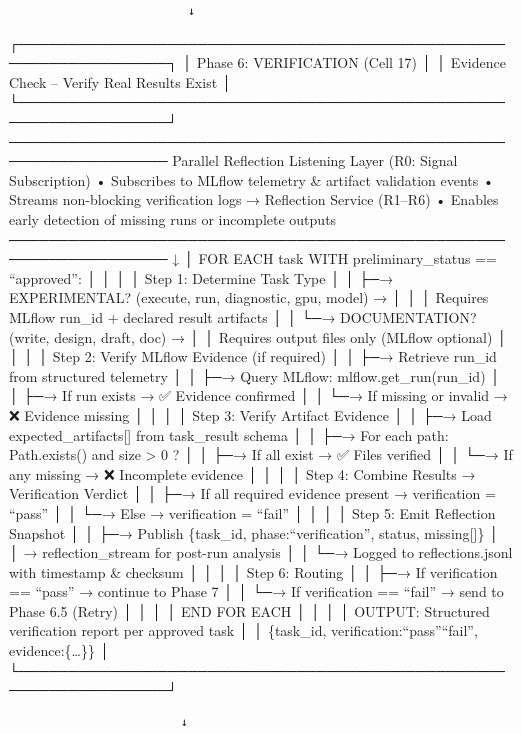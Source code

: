 \documentclass[
]{article}
\begin{document}
\begin{verbatim}
                         ↓
\end{verbatim}

┌─────────────────────────────────────────────────────────────────┐ │
Phase 6: VERIFICATION (Cell 17) │ │ Evidence Check -- Verify Real
Results Exist │
└─────────────────────────────────────────────────────────────────┘
──────────────────────────────────────────────────────────────────
Parallel Reflection Listening Layer (R0: Signal Subscription) •
Subscribes to MLflow telemetry \& artifact validation events • Streams
non-blocking verification logs → Reflection Service (R1--R6) • Enables
early detection of missing runs or incomplete outputs
────────────────────────────────────────────────────────────────── ↓ │
FOR EACH task WITH preliminary\_status == ``approved'': │ │ │ │ Step 1:
Determine Task Type │ │ ├─→ EXPERIMENTAL? (execute, run, diagnostic,
gpu, model) → │ │ │ Requires MLflow run\_id + declared result artifacts
│ │ └─→ DOCUMENTATION? (write, design, draft, doc) → │ │ Requires output
files only (MLflow optional) │ │ │ │ Step 2: Verify MLflow Evidence (if
required) │ │ ├─→ Retrieve run\_id from structured telemetry │ │ ├─→
Query MLflow: mlflow.get\_run(run\_id) │ │ ├─→ If run exists → ✅
Evidence confirmed │ │ └─→ If missing or invalid → ❌ Evidence missing │
│ │ │ Step 3: Verify Artifact Evidence │ │ ├─→ Load
expected\_artifacts{[}{]} from task\_result schema │ │ ├─→ For each
path: Path.exists() and size \textgreater{} 0 ? │ │ ├─→ If all exist →
✅ Files verified │ │ └─→ If any missing → ❌ Incomplete evidence │ │ │
│ Step 4: Combine Results → Verification Verdict │ │ ├─→ If all required
evidence present → verification = ``pass'' │ │ └─→ Else → verification =
``fail'' │ │ │ │ Step 5: Emit Reflection Snapshot │ │ ├─→ Publish
\{task\_id, phase:``verification'', status, missing{[}{]}\} │ │ →
reflection\_stream for post-run analysis │ │ └─→ Logged to
reflections.jsonl with timestamp \& checksum │ │ │ │ Step 6: Routing │ │
├─→ If verification == ``pass'' → continue to Phase 7 │ │ └─→ If
verification == ``fail'' → send to Phase 6.5 (Retry) │ │ │ │ END FOR
EACH │ │ │ │ OUTPUT: Structured verification report per approved task │
│ \{task\_id, verification:``pass''\textbar{}``fail'',
evidence:\{\ldots\}\} │
└─────────────────────────────────────────────────────────────────┘

\begin{verbatim}
                        ↓
\end{verbatim}
\end{document}
